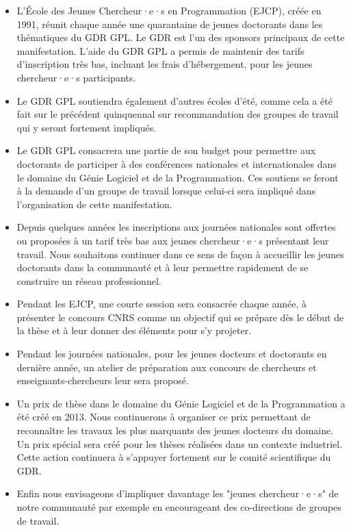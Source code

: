 \documentclass[11pt]{article}
\begin{document}
\begin{itemize}
\item L'École des Jeunes Chercheur·e·s en Programmation (EJCP), créée en 1991, réunit
  chaque année une quarantaine de jeunes doctorants dans les thématiques du GDR
  GPL. Le GDR est l'un des sponsors principaux de cette manifestation.
  L'aide du GDR GPL a permis de maintenir des tarifs d'inscription très bas, incluant
  les frais d'hébergement, pour les jeunes chercheur·e·s participants. 
  
\item Le GDR GPL soutiendra également d'autres écoles d'été, comme cela a été
  fait sur le précédent quinquennal sur recommandation des groupes de travail
  qui y seront fortement impliqués. 
  
\item Le GDR GPL consacrera une partie de son budget pour permettre aux doctorants de participer à des conférences
nationales et internationales dans le domaine du Génie Logiciel et de la
Programmation. Ces soutiens se feront à la demande d'un groupe de travail
lorsque celui-ci sera impliqué dans l'organisation de cette manifestation.



\item Depuis quelques années les inscriptions aux journées nationales sont
  offertes ou proposées à un tarif très bas aux jeunes chercheur·e·s
  présentant leur travail. Nous souhaitons continuer dans ce sens de façon à
  accueillir les jeunes doctorants dans la communauté et à leur permettre
  rapidement de se construire un réseau professionnel.
  
  \item Pendant les EJCP, une courte session sera consacrée chaque année, à présenter le concours CNRS comme un objectif qui se prépare dès le début de la thèse et à leur donner des éléments pour s’y projeter.

\item Pendant les journées nationales, pour les jeunes docteurs et doctorants en dernière année, un atelier de préparation aux concours de chercheurs et enseignants-chercheurs leur sera proposé.

  
\item Un prix de thèse dans le domaine du Génie
  Logiciel et de la Programmation a été créé en 2013. 
  Nous continuerons à organiser ce prix permettant de reconnaître les travaux les plus
  marquants des jeunes docteurs du domaine. Un prix spécial sera créé pour les thèses réalisées dans un contexte industriel.
  Cette action continuera à s'appuyer fortement sur le comité scientifique du GDR.
  
  \item Enfin nous envisageons d'impliquer davantage les "jeunes chercheur·e·s" de notre communauté par exemple en encourageant des co-directions de groupes de travail.
 \end{itemize}
\end{document}
